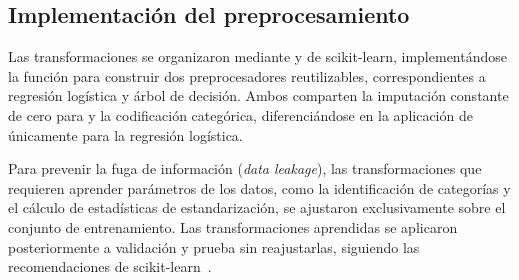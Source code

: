 \subsection{Implementación del preprocesamiento}
Las transformaciones se organizaron mediante  y  de scikit-learn,
implementándose la función  para construir dos preprocesadores reutilizables,
correspondientes a regresión logística y árbol de decisión. Ambos comparten la imputación constante
de cero para  y la codificación categórica, diferenciándose en la aplicación de
 únicamente para la regresión logística.

Para prevenir la fuga de información (\emph{data leakage}), las transformaciones que requieren
aprender parámetros de los datos, como la identificación de categorías y el cálculo de estadísticas
de estandarización, se ajustaron exclusivamente sobre el conjunto de entrenamiento.
Las transformaciones aprendidas se aplicaron posteriormente a validación y prueba sin reajustarlas,
siguiendo las recomendaciones de scikit-learn~\cite{leakage}.

